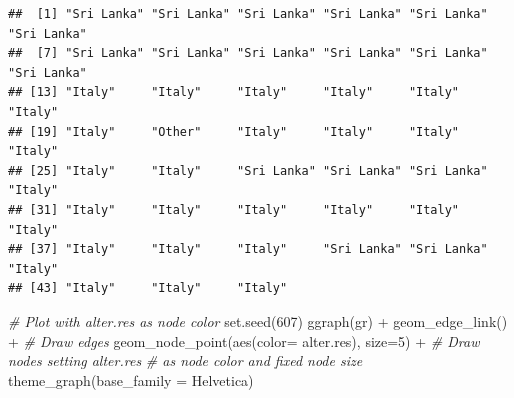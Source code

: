 \documentclass[
]{book}
\newenvironment{Shaded}{\begin{snugshade}}{\end{snugshade}}
\newcommand{\AttributeTok}[1]{\textcolor[rgb]{0.77,0.63,0.00}{#1}}
\newcommand{\CommentTok}[1]{\textcolor[rgb]{0.56,0.35,0.01}{\textit{#1}}}
\newcommand{\DecValTok}[1]{\textcolor[rgb]{0.00,0.00,0.81}{#1}}
\newcommand{\FunctionTok}[1]{\textcolor[rgb]{0.00,0.00,0.00}{#1}}
\newcommand{\NormalTok}[1]{#1}
\newcommand{\SpecialCharTok}[1]{\textcolor[rgb]{0.00,0.00,0.00}{#1}}
\newcommand{\StringTok}[1]{\textcolor[rgb]{0.31,0.60,0.02}{#1}}
\begin{document}
\begin{Shaded}
\end{Shaded}

\begin{verbatim}
##  [1] "Sri Lanka" "Sri Lanka" "Sri Lanka" "Sri Lanka" "Sri Lanka" "Sri Lanka"
##  [7] "Sri Lanka" "Sri Lanka" "Sri Lanka" "Sri Lanka" "Sri Lanka" "Sri Lanka"
## [13] "Italy"     "Italy"     "Italy"     "Italy"     "Italy"     "Italy"    
## [19] "Italy"     "Other"     "Italy"     "Italy"     "Italy"     "Italy"    
## [25] "Italy"     "Italy"     "Sri Lanka" "Sri Lanka" "Sri Lanka" "Italy"    
## [31] "Italy"     "Italy"     "Italy"     "Italy"     "Italy"     "Italy"    
## [37] "Italy"     "Italy"     "Italy"     "Sri Lanka" "Sri Lanka" "Italy"    
## [43] "Italy"     "Italy"     "Italy"
\end{verbatim}

\begin{Shaded}
\begin{Highlighting}[]
\CommentTok{\# Plot with alter.res as node color}
\FunctionTok{set.seed}\NormalTok{(}\DecValTok{607}\NormalTok{)}
\FunctionTok{ggraph}\NormalTok{(gr) }\SpecialCharTok{+} 
  \FunctionTok{geom\_edge\_link}\NormalTok{() }\SpecialCharTok{+} \CommentTok{\# Draw edges}
  \FunctionTok{geom\_node\_point}\NormalTok{(}\FunctionTok{aes}\NormalTok{(}\AttributeTok{color=}\NormalTok{ alter.res), }\AttributeTok{size=}\DecValTok{5}\NormalTok{) }\SpecialCharTok{+} \CommentTok{\# Draw nodes setting alter.res }
  \CommentTok{\# as node color and fixed node size}
  \FunctionTok{theme\_graph}\NormalTok{(}\AttributeTok{base\_family =} \StringTok{\textquotesingle{}Helvetica\textquotesingle{}}\NormalTok{)}
\end{Highlighting}
\end{Shaded}
\end{document}

